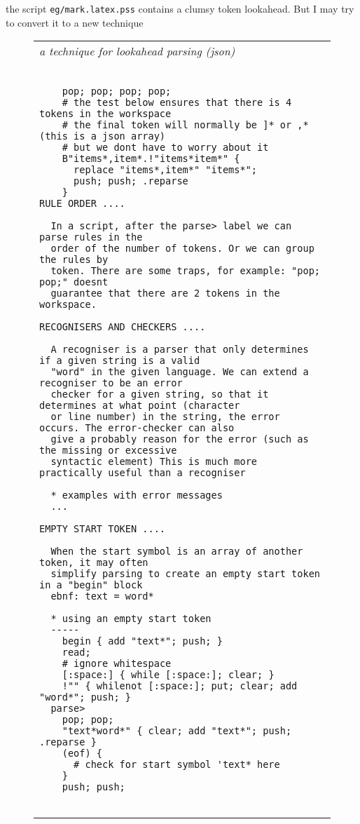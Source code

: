 \documentclass[a4paper,12pt]{article}
\begin{document}
  the script \texttt{eg/mark.latex.pss} contains a clumsy token lookahead.
  But I may try to convert it to a new technique
 \begin{figure}
 \begin{tabular}{ l }
 \emph{ a technique for lookahead parsing (json) } \\ 
 \begin{lstlisting}[breaklines] 

    pop; pop; pop; pop;
    # the test below ensures that there is 4 tokens in the workspace
    # the final token will normally be ]* or ,* (this is a json array)
    # but we dont have to worry about it
    B"items*,item*.!"items*item*" {
      replace "items*,item*" "items*";
      push; push; .reparse
    }
RULE ORDER ....

  In a script, after the parse> label we can parse rules in the
  order of the number of tokens. Or we can group the rules by
  token. There are some traps, for example: "pop; pop;" doesnt
  guarantee that there are 2 tokens in the workspace.

RECOGNISERS AND CHECKERS ....

  A recogniser is a parser that only determines if a given string is a valid
  "word" in the given language. We can extend a recogniser to be an error
  checker for a given string, so that it determines at what point (character
  or line number) in the string, the error occurs. The error-checker can also
  give a probably reason for the error (such as the missing or excessive
  syntactic element) This is much more practically useful than a recogniser

  * examples with error messages
  ...

EMPTY START TOKEN ....

  When the start symbol is an array of another token, it may often
  simplify parsing to create an empty start token in a "begin" block
  ebnf: text = word*

  * using an empty start token
  -----
    begin { add "text*"; push; }
    read;
    # ignore whitespace
    [:space:] { while [:space:]; clear; }
    !"" { whilenot [:space:]; put; clear; add "word*"; push; }
  parse>
    pop; pop;
    "text*word*" { clear; add "text*"; push; .reparse }  
    (eof) { 
      # check for start symbol 'text* here
    }
    push; push; 
  
 \end{lstlisting} 
 \end{tabular} 

 \end{figure}
\end{document}

